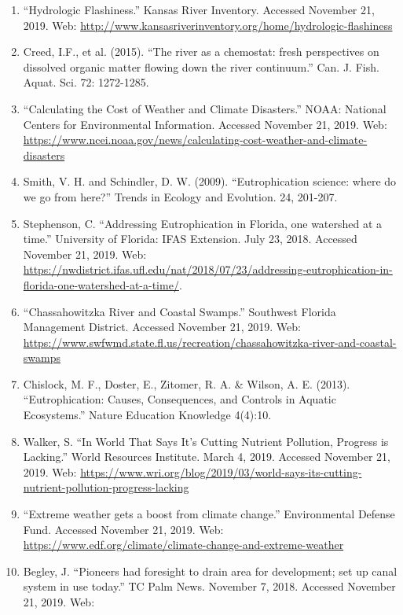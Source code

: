 \documentclass[12pt,]{article}
\begin{document}
\begin{enumerate}
\def\labelenumi{(\arabic{enumi})}
\item
  ``Hydrologic Flashiness.'' Kansas River Inventory. Accessed November
  21, 2019. Web:
  \url{http://www.kansasriverinventory.org/home/hydrologic-flashiness}
\item
  Creed, I.F., et al. (2015). ``The river as a chemostat: fresh
  perspectives on dissolved organic matter flowing down the river
  continuum.'' Can. J. Fish. Aquat. Sci. 72: 1272-1285.
\item
  ``Calculating the Cost of Weather and Climate Disasters.'' NOAA:
  National Centers for Environmental Information. Accessed November 21,
  2019. Web:
  \url{https://www.ncei.noaa.gov/news/calculating-cost-weather-and-climate-disasters}
\item
  Smith, V. H. and Schindler, D. W. (2009). ``Eutrophication science:
  where do we go from here?'' Trends in Ecology and Evolution. 24,
  201-207.
\item
  Stephenson, C. ``Addressing Eutrophication in Florida, one watershed
  at a time.'' University of Florida: IFAS Extension. July 23, 2018.
  Accessed November 21, 2019. Web:
  \url{https://nwdistrict.ifas.ufl.edu/nat/2018/07/23/addressing-eutrophication-in-florida-one-watershed-at-a-time/}.
\item
  ``Chassahowitzka River and Coastal Swamps.'' Southwest Florida
  Management District. Accessed November 21, 2019. Web:
  \url{https://www.swfwmd.state.fl.us/recreation/chassahowitzka-river-and-coastal-swamps}
\item
  Chislock, M. F., Doster, E., Zitomer, R. A. \& Wilson, A. E. (2013).
  ``Eutrophication: Causes, Consequences, and Controls in Aquatic
  Ecosystems.'' Nature Education Knowledge 4(4):10.
\item
  Walker, S. ``In World That Says It's Cutting Nutrient Pollution,
  Progress is Lacking.'' World Resources Institute. March 4, 2019.
  Accessed November 21, 2019. Web:
  \url{https://www.wri.org/blog/2019/03/world-says-its-cutting-nutrient-pollution-progress-lacking}
\item
  ``Extreme weather gets a boost from climate change.'' Environmental
  Defense Fund. Accessed November 21, 2019. Web:
  \url{https://www.edf.org/climate/climate-change-and-extreme-weather}
\item
  Begley, J. ``Pioneers had foresight to drain area for development; set
  up canal system in use today.'' TC Palm News. November 7, 2018.
  Accessed November 21, 2019. Web:

\end{enumerate}
\end{document}
